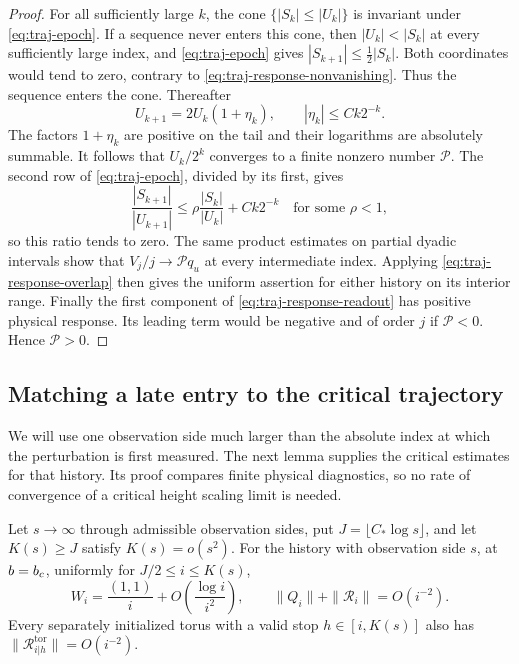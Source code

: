 \begin{proof}
For all sufficiently large \(k\), the cone
\(\{|S_k|\le|U_k|\}\) is invariant under
\eqref{eq:traj-epoch}.  If a sequence never enters this cone,
then \(|U_k|<|S_k|\) at every sufficiently large index, and
\eqref{eq:traj-epoch} gives
\(|S_{k+1}|\le\tfrac12|S_k|\).  Both coordinates would tend to
zero, contrary to \eqref{eq:traj-response-nonvanishing}.  Thus the
sequence enters the cone.  Thereafter
\[
 U_{k+1}=2U_k(1+\eta_k),\qquad
 |\eta_k|\le Ck2^{-k}.
\]
The factors \(1+\eta_k\) are positive on the tail and their
logarithms are absolutely summable.  It follows that
\(U_k/2^k\) converges to a finite nonzero number \(\mathcal P\).
The second row of \eqref{eq:traj-epoch}, divided by its first,
gives
\[
 \frac{|S_{k+1}|}{|U_{k+1}|}
 \le \rho\frac{|S_k|}{|U_k|}+Ck2^{-k}
 \quad\text{for some }\rho<1,
\]
so this ratio tends to zero.  The same product estimates on partial
dyadic intervals show that \(V_j/j\to\mathcal Pq_u\) at every
intermediate index.  Applying \eqref{eq:traj-response-overlap}
then gives the uniform assertion for either history on its interior
range.  Finally the first component of
\eqref{eq:traj-response-readout} has positive physical response.
Its leading term would be negative and of order \(j\) if
\(\mathcal P<0\).  Hence \(\mathcal P>0\).
\end{proof}

\subsection{Matching a late entry to the critical trajectory}

We will use one observation side much larger than the absolute index
at which the perturbation is first measured.  The next lemma supplies
the critical estimates for that history.  Its proof compares finite
physical diagnostics, so no rate of convergence of a critical height
scaling limit is needed.

\begin{lemma}
\label{lem:traj-late-critical}
Let \(s\to\infty\) through admissible observation sides, put
\(J=\lfloor C_*\log s\rfloor\), and let \(K(s)\ge J\) satisfy
\(K(s)=o(s^2)\).  For the history with observation side \(s\), at
\(b=b_c\), uniformly for \(J/2\le i\le K(s)\),
\begin{equation}\label{eq:traj-late-critical}
 W_i=\frac{(1,1)}i+O\!\left(\frac{\log i}{i^2}\right),
 \qquad
 \|Q_i\|+\|\mathcal R_i\|=O(i^{-2}).
\end{equation}
Every separately initialized torus with a valid stop
\(h\in[i,K(s)]\) also has
\(\|\mathcal R_{i|h}^{\mathrm{tor}}\|=O(i^{-2})\).
\end{lemma}

